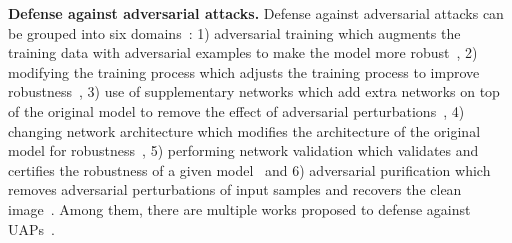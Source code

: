\textbf{Defense against adversarial attacks.} 
Defense against adversarial attacks can be grouped into six domains~\citep{sur_sees}: 1) adversarial training which augments the training data with adversarial examples to make the model more robust~\citep{fgsm,pgd,fast,trades,spgd,fat}, 2) modifying the training process which adjusts the training process to improve robustness~\citep{distill,uat,sat,ltd,score,uap_defense}, 3) use of supplementary networks which add extra networks on top of the original model to remove the effect of adversarial perturbations~\citep{defense_gan,hgd,er_classifier,dg,disco,uapdefensefeatregen}, 4) changing network architecture which modifies the architecture of the original model for robustness~\citep{fdenoise,nas_robust,adv_random,cnls,cfn,fns}, 5) performing network validation which validates and certifies the robustness of a given model~\citep{deep_explore,deep_gauge,sadl} and 6) adversarial purification which removes adversarial perturbations of input samples and recovers the clean image~\citep{irugd,ddpm,adv_proxy,diffpure,densepure}. Among them, there are multiple works proposed to defense against UAPs~\citep{uap,uap_defense,spgd,uapdefensefeatregen,cfn,fns}.
